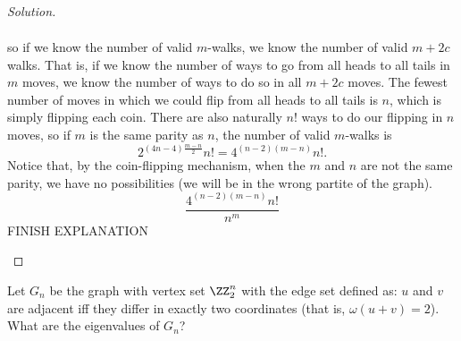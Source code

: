 \documentclass[11pt]{scrartcl}
\begin{document}
\begin{proof}[Solution]
\begin{enumerate}[(i)]
\begin{align*}
    \end{align*}
    so if we know the number of valid $m$-walks, we know the number of valid $m+2c$ walks. That is, if we know the number of ways to go from all heads to all tails in $m$ moves, we know the number of ways to do so in all $m+2c$ moves. The fewest number of moves in which we could flip from all heads to all tails is $n$, which is simply flipping each coin. There are also naturally $n!$ ways to do our flipping in $n$ moves, so if $m$ is the same parity as $n$, the number of valid $m$-walks is \[2^{(4n-4)\frac{m-n}{2}}n!=4^{(n-2)(m-n)}n!.\] Notice that, by the coin-flipping mechanism, when the $m$ and $n$ are not the same parity, we have no possibilities (we will be in the wrong partite of the graph). \[\frac{4^{(n-2)(m-n)}n!}{n^m}\] FINISH EXPLANATION
\end{enumerate}
\end{proof}
\begin{problem}
    Let $G_n$ be the graph with vertex set $\ZZ_2^n$ with the edge set defined as: $u$ and $v$ are adjacent iff they differ in exactly two coordinates (that is, $\omega(u+v)=2$). What are the eigenvalues of $G_n$?
\end{problem}
\end{document}
